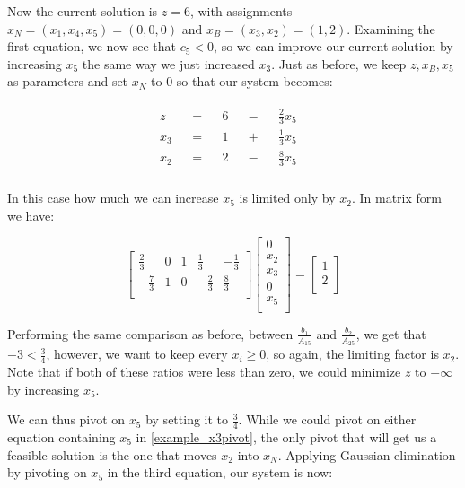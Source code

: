 Now the current solution is $z = 6$, with assignments $x_N = (x_1,x_4,x_5) = (0,0,0)$ and $x_B = (x_3,x_2) = (1, 2)$. Examining the first equation, we now see that $c_5 < 0$, so we can improve our current solution by increasing $x_5$ the same way we just increased $x_3$. Just as before, we keep $z, x_B, x_5$ as parameters and set $x_N$ to 0 so that our system becomes:

\begin{eqnarray}
\begin{aligned}
z && = && 6 && - && \frac{2}{3}x_5 & \\
x_3 &&=&& 1 && + &&\frac{1}{3}x_5 &\\
x_2 &&=&& 2 && - && \frac{8}{3}x_5 &\\
\end{aligned}
\end{eqnarray}

In this case how much we can increase $x_5$ is limited only by $x_2$. In matrix form we have:

\begin{equation}
\begin{bmatrix}
\frac{2}{3} & 0 & 1 & \frac{1}{3} & -\frac{1}{3} \\
-\frac{7}{3} & 1 & 0 & -\frac{2}{3} & \frac{8}{3} \\
\end{bmatrix}
\begin{bmatrix}
0\\x_2\\x_3\\0\\x_5\\
\end{bmatrix}
=
\begin{bmatrix}
1\\2\\
\end{bmatrix}
\end{equation}

Performing the same comparison as before, between $\frac{b_1}{A_{15}}$ and $\frac{b_2}{A_{25}}$, we get that $-3 < \frac{3}{4}$, however, we want to keep every $x_i \geq 0$, so again, the limiting factor is $x_2$. Note that if both of these ratios were less than zero, we could minimize $z$ to $-\infty$ by increasing $x_5$.

We can thus pivot on $x_5$ by setting it to $\frac{3}{4}$. While we could pivot on either equation containing $x_5$ in \ref{example_x3pivot}, the only pivot that will get us a feasible solution is the one that moves $x_2$ into $x_N$.  Applying Gaussian elimination by pivoting on $x_5$ in the third equation, our system is now:

